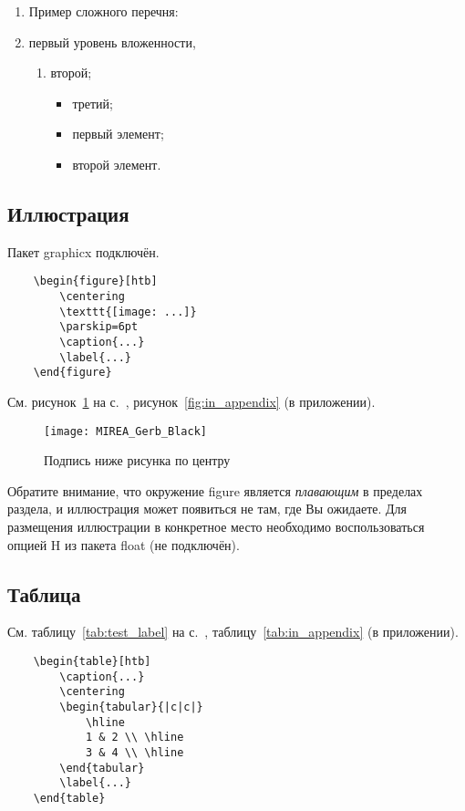 \documentclass[14pt, a4paper, titlepage]{extarticle}
\begin{document}
\begin{enumerate}
	\item[] Пример сложного перечня:
	\item первый уровень вложенности,
	\begin{enumerate}
		\item второй;
		\begin{itemize}
			\item третий;
			\item первый элемент;
			\item второй элемент.
		\end{itemize}
	\end{enumerate}
\end{enumerate}


\subsection{Иллюстрация}

Пакет graphicx подключён.

\begin{verbatim}
	\begin{figure}[htb]
		\centering
		\texttt{[image: ...]}
		\parskip=6pt
		\caption{...}
		\label{...}
	\end{figure}
\end{verbatim}

См. рисунок~\ref{fig:test_label} на с.~\pageref{fig:test_label}, рисунок~\ref{fig:in_appendix} (в приложении).

\begin{figure}[htb]
	\centering
	\texttt{[image: MIREA\_Gerb\_Black]}
	\parskip=6pt
	\caption{Подпись ниже рисунка по центру}
	\label{fig:test_label}
\end{figure}

Обратите внимание, что окружение figure является \emph{плавающим} в пределах раздела, и иллюстрация может появиться не там, где Вы ожидаете. Для размещения иллюстрации в конкретное место необходимо воспользоваться опцией H из пакета float (не подключён).

\subsection{Таблица}

См. таблицу~\ref{tab:test_label} на с.~\pageref{tab:test_label}, таблицу~\ref{tab:in_appendix} (в приложении).

\begin{verbatim}
	\begin{table}[htb]
		\caption{...}
		\centering
		\begin{tabular}{|c|c|} 
			\hline
			1 & 2 \\ \hline
			3 & 4 \\ \hline
		\end{tabular}
		\label{...}
	\end{table}
\end{verbatim}
\end{document}
